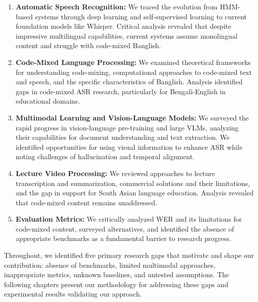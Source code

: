 \begin{enumerate}
    \item \textbf{Automatic Speech Recognition:} We traced the evolution from HMM-based systems through deep learning and self-supervised learning to current foundation models like Whisper. Critical analysis revealed that despite impressive multilingual capabilities, current systems assume monolingual content and struggle with code-mixed Banglish.
    
    \item \textbf{Code-Mixed Language Processing:} We examined theoretical frameworks for understanding code-mixing, computational approaches to code-mixed text and speech, and the specific characteristics of Banglish. Analysis identified gaps in code-mixed ASR research, particularly for Bengali-English in educational domains.
    
    \item \textbf{Multimodal Learning and Vision-Language Models:} We surveyed the rapid progress in vision-language pre-training and large VLMs, analyzing their capabilities for document understanding and text extraction. We identified opportunities for using visual information to enhance ASR while noting challenges of hallucination and temporal alignment.
    
    \item \textbf{Lecture Video Processing:} We reviewed approaches to lecture transcription and summarization, commercial solutions and their limitations, and the gap in support for South Asian language education. Analysis revealed that code-mixed content remains unaddressed.
    
    \item \textbf{Evaluation Metrics:} We critically analyzed WER and its limitations for code-mixed content, surveyed alternatives, and identified the absence of appropriate benchmarks as a fundamental barrier to research progress.
\end{enumerate}

Throughout, we identified five primary research gaps that motivate and shape our contribution: absence of benchmarks, limited multimodal approaches, inappropriate metrics, unknown baselines, and untested assumptions. The following chapters present our methodology for addressing these gaps and experimental results validating our approach.